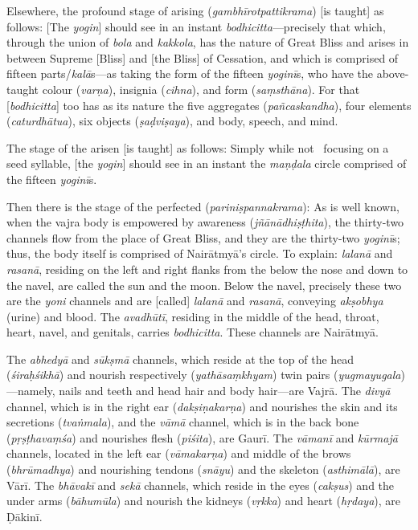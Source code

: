 \documentclass[naipra.tex]{subfiles}
\begin{document}
Elsewhere, the profound stage of arising (\emph{gambhīrotpattikrama}) [is taught] as follows:
[The \emph{yogin}] should see in an instant \emph{bodhicitta}—precisely that which, through the union of \emph{bola} and \emph{kakkola}, has the nature of Great Bliss and arises in between Supreme [Bliss] and [the Bliss] of Cessation, and which is comprised of fifteen parts/\emph{kalā}s—as taking the form of the fifteen \emph{yoginī}s, who have the above-taught colour (\emph{varṇa}), insignia (\emph{cihna}), and form (\emph{saṃsthāna}).
For that [\emph{bodhicitta}] too has as its nature the five aggregates (\emph{pañcaskandha}), four elements (\emph{caturdhātua}), six objects (\emph{ṣaḍviṣaya}), and body, speech, and mind.

The stage of the arisen [is taught] as follows:
Simply while \crux not \crux\ focusing on a seed syllable, [the \emph{yogin}] should see in an instant the \emph{maṇḍala} circle comprised of the fifteen \emph{yoginī}s.

Then there is the stage of the perfected (\emph{pariniṣpannakrama}):
As is well known, when the vajra body is empowered by awareness (\emph{jñānādhiṣṭhita}), the thirty-two channels flow from the place of Great Bliss, and they are the thirty-two \emph{yoginī}s; thus, the body itself is comprised of Nairātmyā's circle.
To explain: \emph{lalanā} and \emph{rasanā}, residing on the left and right flanks from the below the nose and down to the navel, are called the sun and the moon.
Below the navel, precisely these two are the \emph{yoni} channels and are [called] \emph{lalanā} and \emph{rasanā}, conveying \emph{akṣobhya} (urine) and blood.
The \emph{avadhūtī}, residing in the middle of the head, throat, heart, navel, and genitals, carries \emph{bodhicitta}.
These channels are Nairātmyā.

The \emph{abhedyā} and \emph{sūkṣmā} channels, which reside at the top of the head (\emph{śiraḥśikhā}) and nourish respectively (\emph{yathāsaṃkhyam}) twin pairs (\emph{yugmayugala})—namely, nails and teeth and head hair and body hair—are Vajrā.
The \emph{divyā} channel, which is in the right ear (\emph{dakṣiṇakarṇa}) and nourishes the skin and its secretions (\emph{tvaṅmala}), and the \emph{vāmā} channel, which is in the back bone (\emph{pṛṣṭhavaṃśa}) and nourishes flesh (\emph{piśita}), are Gaurī.
The \emph{vāmanī} and \emph{kūrmajā} channels, located in the left ear (\emph{vāmakarṇa}) and middle of the brows (\emph{bhrūmadhya}) and nourishing tendons (\emph{snāyu}) and the skeleton (\emph{asthimālā}), are Vārī.
The \emph{bhāvakī} and \emph{sekā} channels, which reside in the eyes (\emph{cakṣus}) and the under arms (\emph{bāhumūla}) and nourish the kidneys (\emph{vṛkka}) and heart (\emph{hṛdaya}), are Ḍākinī.
\end{document}
